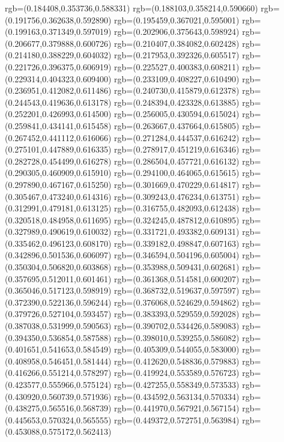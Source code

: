 {{{			rgb=(0.184408,0.353736,0.588331)
			rgb=(0.188103,0.358214,0.590660)
			rgb=(0.191756,0.362638,0.592890)
			rgb=(0.195459,0.367021,0.595001)
			rgb=(0.199163,0.371349,0.597019)
			rgb=(0.202906,0.375643,0.598924)
			rgb=(0.206677,0.379888,0.600726)
			rgb=(0.210407,0.384082,0.602428)
			rgb=(0.214180,0.388229,0.604032)
			rgb=(0.217953,0.392326,0.605517)
			rgb=(0.221726,0.396375,0.606919)
			rgb=(0.225527,0.400383,0.608211)
			rgb=(0.229314,0.404323,0.609400)
			rgb=(0.233109,0.408227,0.610490)
			rgb=(0.236951,0.412082,0.611486)
			rgb=(0.240730,0.415879,0.612378)
			rgb=(0.244543,0.419636,0.613178)
			rgb=(0.248394,0.423328,0.613885)
			rgb=(0.252201,0.426993,0.614500)
			rgb=(0.256005,0.430594,0.615024)
			rgb=(0.259841,0.434141,0.615458)
			rgb=(0.263667,0.437664,0.615805)
			rgb=(0.267452,0.441112,0.616066)
			rgb=(0.271284,0.444537,0.616242)
			rgb=(0.275101,0.447889,0.616335)
			rgb=(0.278917,0.451219,0.616346)
			rgb=(0.282728,0.454499,0.616278)
			rgb=(0.286504,0.457721,0.616132)
			rgb=(0.290305,0.460909,0.615910)
			rgb=(0.294100,0.464065,0.615615)
			rgb=(0.297890,0.467167,0.615250)
			rgb=(0.301669,0.470229,0.614817)
			rgb=(0.305467,0.473240,0.614316)
			rgb=(0.309243,0.476234,0.613751)
			rgb=(0.312991,0.479181,0.613125)
			rgb=(0.316755,0.482093,0.612438)
			rgb=(0.320518,0.484958,0.611695)
			rgb=(0.324245,0.487812,0.610895)
			rgb=(0.327989,0.490619,0.610032)
			rgb=(0.331721,0.493382,0.609131)
			rgb=(0.335462,0.496123,0.608170)
			rgb=(0.339182,0.498847,0.607163)
			rgb=(0.342896,0.501536,0.606097)
			rgb=(0.346594,0.504196,0.605004)
			rgb=(0.350304,0.506820,0.603868)
			rgb=(0.353988,0.509431,0.602681)
			rgb=(0.357695,0.512011,0.601461)
			rgb=(0.361368,0.514581,0.600207)
			rgb=(0.365046,0.517123,0.598919)
			rgb=(0.368732,0.519637,0.597597)
			rgb=(0.372390,0.522136,0.596244)
			rgb=(0.376068,0.524629,0.594862)
			rgb=(0.379726,0.527104,0.593457)
			rgb=(0.383393,0.529559,0.592028)
			rgb=(0.387038,0.531999,0.590563)
			rgb=(0.390702,0.534426,0.589083)
			rgb=(0.394350,0.536854,0.587588)
			rgb=(0.398010,0.539255,0.586082)
			rgb=(0.401651,0.541653,0.584549)
			rgb=(0.405309,0.544055,0.583000)
			rgb=(0.408958,0.546451,0.581444)
			rgb=(0.412620,0.548836,0.579883)
			rgb=(0.416266,0.551214,0.578297)
			rgb=(0.419924,0.553589,0.576723)
			rgb=(0.423577,0.555966,0.575124)
			rgb=(0.427255,0.558349,0.573533)
			rgb=(0.430920,0.560739,0.571936)
			rgb=(0.434592,0.563134,0.570334)
			rgb=(0.438275,0.565516,0.568739)
			rgb=(0.441970,0.567921,0.567154)
			rgb=(0.445653,0.570324,0.565555)
			rgb=(0.449372,0.572751,0.563984)
			rgb=(0.453088,0.575172,0.562413)
}}}
